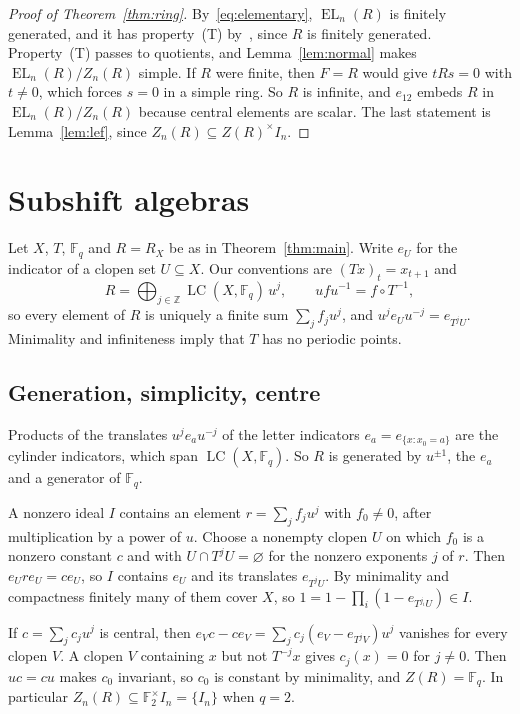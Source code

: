 \documentclass[11pt]{amsart}
\newcommand{\F}{\mathbb F}
\newcommand{\Z}{\mathbb Z}
\newcommand{\LC}{\operatorname{LC}}
\newcommand{\EL}{\operatorname{EL}}
\begin{document}
\begin{proof}[Proof of Theorem~\ref{thm:ring}]
By~\eqref{eq:elementary}, $\EL_n(R)$ is finitely generated, and it has
property~\textup{(T)} by~\cite[Theorem~1.1]{EJZ}, since $R$ is finitely
generated. Property~\textup{(T)} passes to quotients, and
Lemma~\ref{lem:normal} makes $\EL_n(R)/Z_n(R)$ simple. If $R$ were
finite, then $F=R$ would give $tRs=0$ with $t\ne0$, which forces $s=0$
in a simple ring. So $R$ is infinite, and $e_{12}$ embeds $R$ in
$\EL_n(R)/Z_n(R)$ because central elements are scalar. The last
statement is Lemma~\ref{lem:lef}, since
$Z_n(R)\subseteq Z(R)^\times I_n$.
\end{proof}

\section{Subshift algebras}

Let $X$, $T$, $\F_q$ and $R=R_X$ be as in Theorem~\ref{thm:main}. Write
$e_U$ for the indicator of a clopen set $U\subseteq X$. Our conventions
are $(Tx)_t=x_{t+1}$ and
\[
 R=\bigoplus_{j\in\Z}\LC(X,\F_q)\,u^j,\qquad ufu^{-1}=f\circ T^{-1},
\]
so every element of $R$ is uniquely a finite sum $\sum_jf_ju^j$, and
$u^je_Uu^{-j}=e_{T^jU}$. Minimality and infiniteness imply that $T$ has
no periodic points.

\subsection*{Generation, simplicity, centre}
Products of the translates $u^je_au^{-j}$ of the letter indicators
$e_a=e_{\{x:x_0=a\}}$ are the cylinder indicators, which span
$\LC(X,\F_q)$. So $R$ is generated by $u^{\pm1}$, the $e_a$ and a
generator of $\F_q$.

A nonzero ideal $I$ contains an element $r=\sum_jf_ju^j$ with $f_0\ne0$,
after multiplication by a power of $u$. Choose a nonempty clopen $U$ on
which $f_0$ is a nonzero constant $c$ and with $U\cap T^jU=\varnothing$
for the nonzero exponents $j$ of $r$. Then $e_Ure_U=ce_U$, so $I$ contains
$e_U$ and its translates $e_{T^jU}$. By minimality and compactness
finitely many of them cover $X$, so $1=1-\prod_i(1-e_{T^{j_i}U})\in I$.

If $c=\sum_jc_ju^j$ is central, then
$e_Vc-ce_V=\sum_jc_j(e_V-e_{T^jV})u^j$ vanishes for every clopen $V$. A
clopen $V$ containing $x$ but not $T^{-j}x$ gives $c_j(x)=0$ for $j\ne0$.
Then $uc=cu$ makes $c_0$ invariant, so $c_0$ is constant by minimality,
and $Z(R)=\F_q$. In particular $Z_n(R)\subseteq\F_2^\times I_n=\{I_n\}$
when $q=2$.
\end{document}

